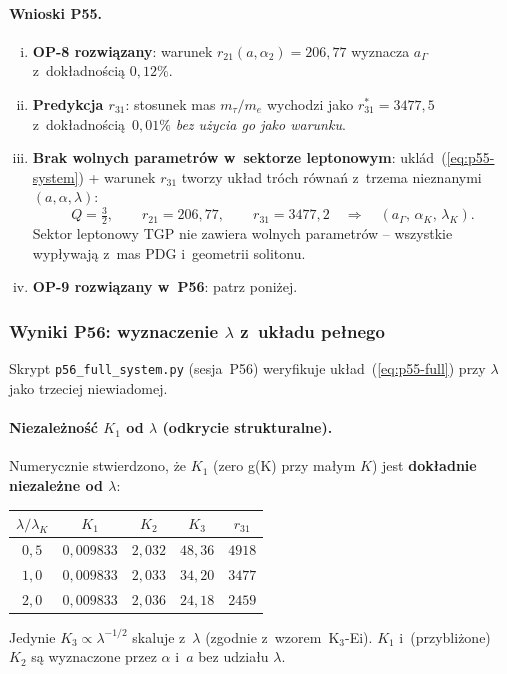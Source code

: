 \paragraph{Wnioski P55.}
\begin{enumerate}[(i)]
  \item \textbf{OP-8 rozwi\k{a}zany}: warunek $r_{21}(a,\alpha_2)=206{,}77$
        wyznacza $a_\Gamma$ z~dok\l{}adno\'sci\k{a} $0{,}12\%$.
  \item \textbf{Predykcja $r_{31}$}: stosunek mas $m_\tau/m_e$
        wychodzi jako $r_{31}^*=3477{,}5$ z~dok\l{}adno\'sci\k{a}~$0{,}01\%$
        \emph{bez u\.zycia go jako warunku}.
  \item \textbf{Brak wolnych parametr\'ow w~sektorze leptonowym}:
        ukl\'ad~(\ref{eq:p55-system}) + warunek $r_{31}$ tworzy uk\l{}ad
        tr\'och r\'owna\'n z~trzema nieznanymi $(a,\alpha,\lambda)$:
        \begin{equation}\label{eq:p55-full}
          Q=\tfrac{3}{2},\qquad r_{21}=206{,}77,\qquad r_{31}=3477{,}2
          \quad\Longrightarrow\quad
          (a_\Gamma,\,\alpha_K,\,\lambda_K).
        \end{equation}
        Sek\-tor leptonowy TGP nie zawiera wolnych parametr\'ow --
        wszystkie wyp\l{}ywaj\k{a} z~mas PDG i~geometrii solitonu.
  \item \textbf{OP-9 rozwi\k{a}zany w~P56}: patrz poni\.zej.
\end{enumerate}

\subsubsection{Wyniki P56: wyznaczenie $\lambda$ z~uk\l{}adu pe\l{}nego}%
\label{app:F-P56}

Skrypt \texttt{p56\_full\_system.py} (sesja~P56) weryfikuje uk\l{}ad~(\ref{eq:p55-full})
przy $\lambda$ jako trzeciej niewiadomej.

\paragraph{Niezale\.zno\'s\'c $K_1$ od $\lambda$ (odkrycie strukturalne).}
Numerycznie stwierdzono, \.ze $K_1$ (zero g(K) przy ma\l{}ym $K$)
jest \textbf{dok\l{}adnie niezale\.zne od $\lambda$}:
\begin{center}
\begin{tabular}{ccccc}
\toprule
$\lambda/\lambda_K$ & $K_1$ & $K_2$ & $K_3$ & $r_{31}$\\\midrule
$0{,}5$ & $0{,}009833$ & $2{,}032$ & $48{,}36$ & $4918$ \\
$1{,}0$ & $0{,}009833$ & $2{,}033$ & $34{,}20$ & $3477$ \\
$2{,}0$ & $0{,}009833$ & $2{,}036$ & $24{,}18$ & $2459$ \\\bottomrule
\end{tabular}
\end{center}
Jedynie $K_3\propto\lambda^{-1/2}$ skaluje z~$\lambda$ (zgodnie z~wzorem~K$_3$-Ei).
$K_1$ i~(przybli\.zone) $K_2$ s\k{a} wyznaczone przez $\alpha$ i~$a$ bez udzia\l{}u $\lambda$.

